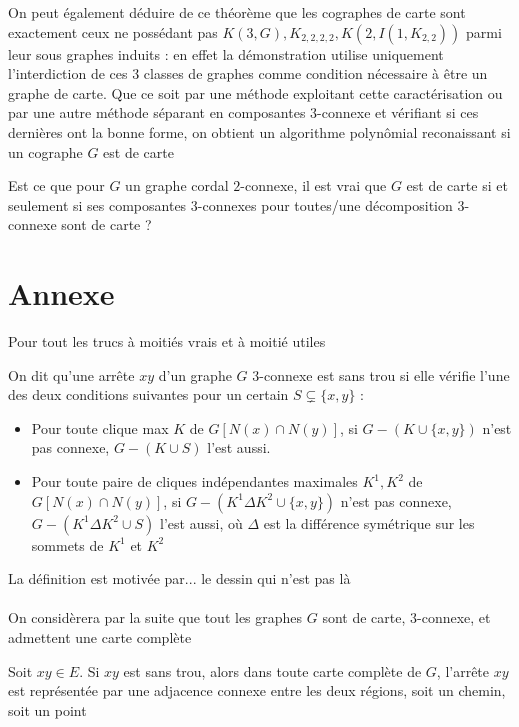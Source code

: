 \documentclass{scrartcl}
\begin{document}
\begin{flushleft}
On peut également déduire de ce théorème que les cographes de carte sont exactement ceux ne possédant pas $K(3, G), K_{2,2,2,2}, K(2, I(1, K_{2,2}))$
parmi leur sous graphes induits : en effet la démonstration utilise uniquement l'interdiction de ces $3$ classes de graphes comme condition nécessaire
à être un graphe de carte. Que ce soit par une méthode exploitant cette caractérisation ou par une autre méthode séparant en composantes
$3$-connexe et vérifiant si ces dernières ont la bonne forme, on obtient un algorithme polynômial reconaissant si un cographe $G$ est de carte

\begin{quest}
    Est ce que pour $G$ un graphe cordal $2$-connexe, il est vrai que $G$ est de carte si et seulement si ses composantes $3$-connexes pour
    toutes/une décomposition $3$-connexe sont de carte ?
\end{quest}

\section*{Annexe}

Pour tout les trucs à moitiés vrais et à moitié utiles


\begin{def*}
    On dit qu'une arrête $xy$ d'un graphe $G$ $3$-connexe est sans trou si elle vérifie l'une des deux conditions suivantes pour un certain
    $S \subsetneq \{x, y\}$ :
    \begin{itemize}
        \item Pour toute clique max $K$ de $G[N(x) \cap N(y)]$, si $G - (K \cup \{x,y\})$ n'est pas connexe, $G - (K \cup S)$ l'est aussi.
        \item Pour toute paire de cliques indépendantes maximales $K^1, K^2$ de $G[N(x) \cap N(y)]$, si $G - (K^1 \Delta K^2 \cup \{x,y\})$ n'est pas connexe,
        $G - (K^1 \Delta K^2 \cup S)$ l'est aussi, où $\Delta$ est la différence symétrique sur les sommets de $K^1$ et $K^2$
    \end{itemize}
\end{def*}

La définition est motivée par... le dessin qui n'est pas là
\\~\\
On considèrera par la suite que tout les graphes $G$ sont de carte, $3$-connexe, et admettent une carte complète

\begin{lem}\label{contrSanstrou}
    Soit $xy \in E$. Si $xy$ est sans trou, alors dans toute carte complète de $G$, l'arrête $xy$ est représentée par une adjacence
    connexe entre les deux régions, soit un chemin, soit un point
\end{lem}


\end{flushleft}
\end{document}

